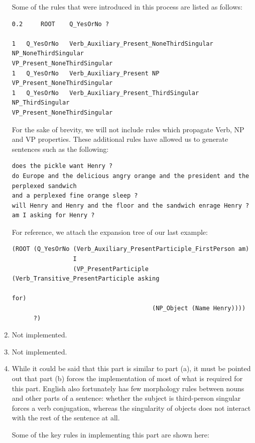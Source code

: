 \documentclass[11pt]{article}
\begin{document}
\begin{enumerate}
      Some of the rules that were introduced in this process are listed as follows:

\begin{verbatim}
0.2     ROOT    Q_YesOrNo ?

1   Q_YesOrNo   Verb_Auxiliary_Present_NoneThirdSingular NP_NoneThirdSingular 
VP_Present_NoneThirdSingular
1   Q_YesOrNo   Verb_Auxiliary_Present NP VP_Present_NoneThirdSingular
1   Q_YesOrNo   Verb_Auxiliary_Present_ThirdSingular NP_ThirdSingular 
VP_Present_NoneThirdSingular
\end{verbatim}

      For the sake of brevity, we will not include rules which propagate Verb, NP and VP properties. These additional rules have allowed us to generate sentences such as the following:

\begin{verbatim}
does the pickle want Henry ?
do Europe and the delicious angry orange and the president and the perplexed sandwich 
and a perplexed fine orange sleep ?
will Henry and Henry and the floor and the sandwich enrage Henry ?
am I asking for Henry ?
\end{verbatim}

      For reference, we attach the expansion tree of our last example:

\begin{verbatim}
(ROOT (Q_YesOrNo (Verb_Auxiliary_PresentParticiple_FirstPerson am)
                 I
                 (VP_PresentParticiple (Verb_Transitive_PresentParticiple asking
                                                                          for)
                                       (NP_Object (Name Henry))))
      ?)
\end{verbatim}

      \item Not implemented.
      \item Not implemented.
      \item While it could be said that this part is similar to part (a), it must be pointed out that part (b) forces the implementation of most of what is required for this part. English also fortunately has few morphology rules between nouns and other parts of a sentence: whether the subject is third-person singular forces a verb conjugation, whereas the singularity of objects does not interact with the rest of the sentence at all.

      Some of the key rules in implementing this part are shown here:


\end{enumerate}
\end{document}
